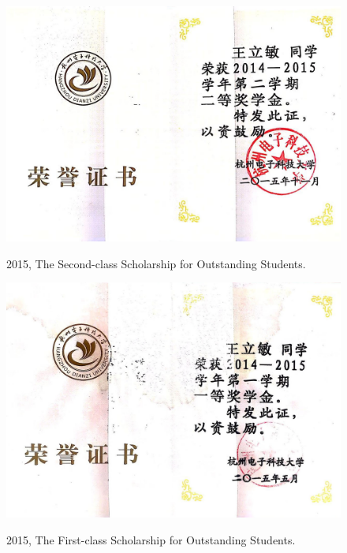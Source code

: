 \documentclass[11pt]{article}
\begin{document}
\begin{figure}[ht]
	\centering
	\includegraphics[width=14cm]{fig/cer4.jpg}\\
	\caption{2015, The Second-class Scholarship for Outstanding Students.}
\end{figure}

\begin{figure}[ht]
	\centering
	\includegraphics[width=14cm]{fig/cer5.jpg}\\
	\caption{2015, The First-class Scholarship for Outstanding Students.}
\end{figure}
\end{document}
